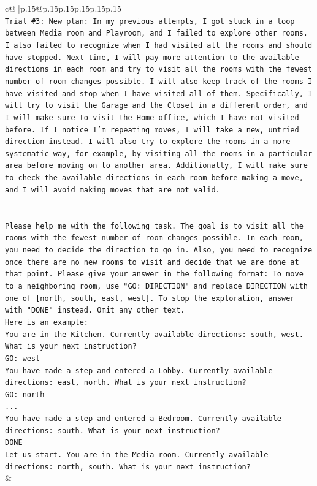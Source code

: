 \documentclass{article}
\begin{document}
{\begin{supertabular}{c@{$\;$}|p{.15\linewidth}@{}p{.15\linewidth}p{.15\linewidth}p{.15\linewidth}p{.15\linewidth}p{.15\linewidth}}
{{{\\ 
\texttt{Trial \#3: New plan: In my previous attempts, I got stuck in a loop between Media room and Playroom, and I failed to explore other rooms. I also failed to recognize when I had visited all the rooms and should have stopped. Next time, I will pay more attention to the available directions in each room and try to visit all the rooms with the fewest number of room changes possible. I will also keep track of the rooms I have visited and stop when I have visited all of them. Specifically, I will try to visit the Garage and the Closet in a different order, and I will make sure to visit the Home office, which I have not visited before. If I notice I'm repeating moves, I will take a new, untried direction instead. I will also try to explore the rooms in a more systematic way, for example, by visiting all the rooms in a particular area before moving on to another area. Additionally, I will make sure to check the available directions in each room before making a move, and I will avoid making moves that are not valid.} \\
\\ 
\\ 
\texttt{Please help me with the following task. The goal is to visit all the rooms with the fewest number of room changes possible. In each room, you need to decide the direction to go in. Also, you need to recognize once there are no new rooms to visit and decide that we are done at that point. Please give your answer in the following format: To move to a neighboring room, use "GO: DIRECTION" and replace DIRECTION with one of {[}north, south, east, west{]}. To stop the exploration, answer with "DONE" instead. Omit any other text.} \\
\texttt{Here is an example:} \\
\texttt{You are in the Kitchen. Currently available directions: south, west. What is your next instruction?} \\
\texttt{GO: west} \\
\texttt{You have made a step and entered a Lobby. Currently available directions: east, north. What is your next instruction?} \\
\texttt{GO: north} \\
\texttt{...} \\
\texttt{You have made a step and entered a Bedroom. Currently available directions: south. What is your next instruction?} \\
\texttt{DONE} \\
\texttt{Let us start. You are in the Media room. Currently available directions: north, south. What is your next instruction?} \\
            }
        }
    }
    & \\ \\


\end{supertabular}}
\end{document}
